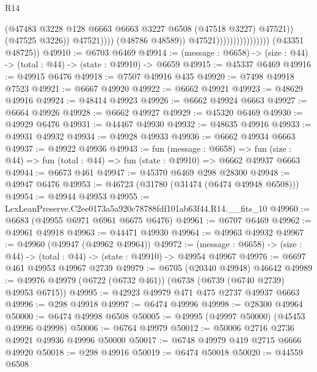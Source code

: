 \begin{lexlean}{R14}
\begin{coremodule}
                                                    (@47483
                                                      @3228
                                                      @128
                                                      @6663
                                                      @6663
                                                      @3227
                                                      @6508
                                                      (@47518 @3227)
                                                      @47521))
                                                  (@47525 @3226))
                                                @47521))))
                                        (@48786 @48589))
                                      @47521))))))))))))))))
      (@43351 @48725))
@49910 := @6703 @6469
@49914 := (message : @6658) -> (size : @44) -> (total : @44) -> (state : @49910) -> @6659
@49915 := @45337 @6469
@49916 := @49915 @6476
@49918 := @7507 @49916 @435
@49920 := @7498 @49918 @7523
@49921 := @6667 @49920
@49922 := @6662 @49921
@49923 := @48629 @49916
@49924 := @48414 @49923
@49926 := @6662 @49924 @6663
@49927 := @6664 @49926
@49928 := @6662 @49927
@49929 := @45320 @6469
@49930 := @49929 @6476
@49931 := @44467 @49930
@49932 := @48635 @49916
@49933 := @49931 @49932
@49934 := @49928 @49933
@49936 := @6662 @49934 @6663
@49937 := @49922 @49936
@49943 := fun (message : @6658) =>
  fun (size : @44) => fun (total : @44) => fun (state : @49910) => @6662 @49937 @6663
@49944 := @6673 @461
@49947 := @45370 @6469 @298 @28300
@49948 := @49947 @6476
@49953 := @46723 (@31780 (@31474 (@6474 @49948 @6508)))
@49954 := @49944 @49953
@49955 := LexLeanPreserve.C2ee0173a5a920c78788fdf101ab63f44.R14.__fits_10
@49960 := @6683 (@49955 @6971 @6961 @6675 @6476)
@49961 := @6707 @6469
@49962 := @49961 @49918
@49963 := @44471 @49930
@49964 := @49963 @49932
@49967 := @49960 (@49947 (@49962 @49964))
@49972 := (message : @6658) -> (size : @44) -> (total : @44) -> (state : @49910) -> @49954 @49967
@49976 := @6697 @461 @49953 @49967 @2739
@49979 := @6705 (@20340 @49948) @46642
@49989 := @49976 @49979 (@6722 (@6732 @461)) (@6738 (@6739 (@6740 @2739) @49953 @6715))
@49995 := @42923 @49979 @471 @475 @2737 @49937 @6663
@49996 := @298 @49918
@49997 := @6474 @49996
@49998 := @28300 @49964
@50000 := @6474 @49998 @6508
@50005 := @49995 (@49997 @50000) (@45453 @49996 @49998)
@50006 := @6764 @49979
@50012 := @50006 @2716 @2736 @49921 @49936 @49996 @50000
@50017 := @6748 @49979 @419 @2715 @6666 @49920
@50018 := @298 @49916
@50019 := @6474 @50018
@50020 := @44559 @6508

\end{coremodule}
\end{lexlean}
